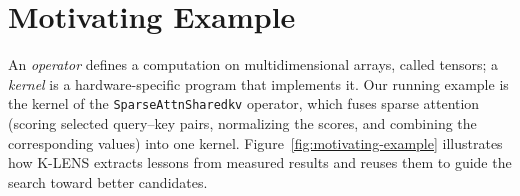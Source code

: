 \documentclass[acmsmall,screen,review,anonymous,nonacm]{acmart}
\newcommand{\klens}{\textsc{K-LENS}\xspace}
\newcommand{\ascendc}{\textsc{AscendC}\xspace}
\begin{document}





\section{Motivating Example}
\label{sec:motivation}
An \emph{operator} defines a computation on multidimensional arrays, called
tensors; a \emph{kernel} is a hardware-specific program that implements it.
Our running example is the kernel of the \texttt{SparseAttnSharedkv} operator,
which fuses sparse attention (scoring selected query--key pairs, normalizing
the scores, and combining the corresponding values) into one kernel.
Figure~\ref{fig:motivating-example} illustrates how \klens extracts lessons from measured results and reuses them to guide the search toward better candidates.
\end{document}
